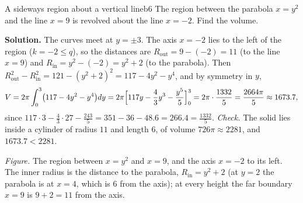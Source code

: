 \documentclass[11pt]{article}
\begin{document}
\begin{exmp}{A sideways region about a vertical line}{b6}
The region between the parabola $x=y^2$ and the line $x=9$ is revolved about the line $x=-2$. Find the volume.

\textbf{Solution.} The curves meet at $y=\pm3$. The axis $x=-2$ lies to the left of the region ($k=-2\le q$), so the distances are $R_{\mathrm{out}}=9-(-2)=11$ (to the line $x=9$) and $R_{\mathrm{in}}=y^2-(-2)=y^2+2$ (to the parabola). Then $R_{\mathrm{out}}^2-R_{\mathrm{in}}^2=121-(y^2+2)^2=117-4y^2-y^4$, and by symmetry in $y$,
\[
V=2\pi\int_0^3\bigl(117-4y^2-y^4\bigr)dy=2\pi\Bigl[117y-\frac43y^3-\frac{y^5}5\Bigr]_0^3=2\pi\cdot\frac{1332}5=\frac{2664\pi}5\approx1673.7 ,
\]
since $117\cdot3-\frac43\cdot27-\frac{243}5=351-36-48.6=266.4=\frac{1332}5$.
\emph{Check.} The solid lies inside a cylinder of radius $11$ and length $6$, of volume $726\pi\approx2281$, and $1673.7<2281$.
\begin{center}
\par\small\emph{Figure.} The region between $x=y^2$ and $x=9$, and the axis $x=-2$ to its left. The inner radius is the distance to the parabola, $R_{\mathrm{in}}=y^2+2$ (at $y=2$ the parabola is at $x=4$, which is $6$ from the axis); at every height the far boundary $x=9$ is $9+2=11$ from the axis.
\end{center}
\end{exmp}
\end{document}
